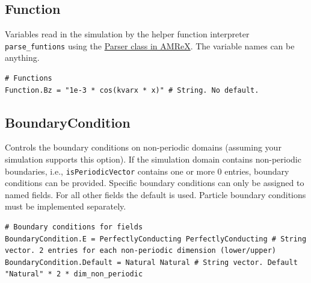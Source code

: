 \documentclass[11pt]{article}
\begin{document}
\subsection{Function}
Variables read in the simulation by the helper function interpreter \verb|parse_funtions| using the \href{https://amrex-codes.github.io/amrex/docs_html/Basics.html#parser}{Parser class in AMReX}. The variable names can be anything.
\begin{lstlisting}[language=pkgconfig]
# Functions
Function.Bz = "1e-3 * cos(kvarx * x)" # String. No default.
\end{lstlisting}

\subsection{BoundaryCondition}
Controls the boundary conditions on non-periodic domains (assuming your simulation supports this option). If the simulation domain contains non-periodic boundaries, i.e., \verb|isPeriodicVector| contains one or more 0 entries, boundary conditions can be provided. Specific boundary conditions can only be assigned to named fields. For all other fields the default is used.
Particle boundary conditions must be implemented separately.
\begin{lstlisting}[language=pkgconfig]
# Boundary conditions for fields
BoundaryCondition.E = PerfectlyConducting PerfectlyConducting # String vector. 2 entries for each non-periodic dimension (lower/upper)
BoundaryCondition.Default = Natural Natural # String vector. Default "Natural" * 2 * dim_non_periodic
\end{lstlisting}
\end{document}

